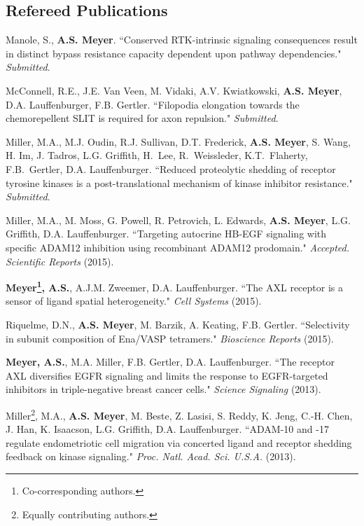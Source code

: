 \documentclass[11pt]{res}
\begin{document}
\begin{resume}
\section{Refereed Publications}
{ \leftskip 0.1in
\parindent -0.1in


Manole, S., {\bf A.S. Meyer}. ``Conserved RTK-intrinsic signaling consequences result in distinct bypass resistance capacity dependent upon pathway dependencies." {\sl Submitted}.

\parskip 0.1in

McConnell, R.E., J.E. Van Veen, M. Vidaki, A.V. Kwiatkowski, {\bf A.S. Meyer}, D.A. Lauffenburger, F.B. Gertler. ``Filopodia elongation towards the chemorepellent SLIT is required for axon repulsion." {\sl Submitted}.

Miller, M.A., M.J. Oudin, R.J. Sullivan, D.T. Frederick, {\bf A.S. Meyer}, S. Wang, H. Im, J. Tadros, L.G. Griffith, H. Lee, R. Weissleder, K.T. Flaherty, F.B. Gertler, D.A. Lauffenburger. ``Reduced proteolytic shedding of receptor tyrosine kinases is a post-translational mechanism of kinase inhibitor resistance." {\sl Submitted}.

Miller, M.A., M. Moss, G. Powell, R. Petrovich, L. Edwards, {\bf A.S. Meyer}, L.G. Griffith, D.A. Lauffenburger. ``Targeting autocrine HB-EGF signaling with specific ADAM12 inhibition using recombinant ADAM12 prodomain." {\sl Accepted. Scientific Reports} (2015).

{\bf Meyer\footnote{Co-corresponding authors.}, A.S.}, A.J.M. Zweemer, D.A. Lauffenburger\footnotemark[\value{footnote}]. ``The AXL receptor is a sensor of ligand spatial heterogeneity." {\sl Cell Systems} (2015).

Riquelme, D.N., {\bf A.S. Meyer}, M. Barzik, A. Keating, F.B. Gertler. ``Selectivity in subunit composition of Ena/VASP tetramers." {\sl Bioscience Reports} (2015).

{\bf Meyer, A.S.}, M.A. Miller, F.B. Gertler, D.A. Lauffenburger. ``The receptor AXL diversifies EGFR signaling and limits the response to EGFR-targeted inhibitors in triple-negative breast cancer cells." {\sl Science Signaling} (2013).

Miller\footnote{Equally contributing authors.}, M.A., {\bf A.S. Meyer}\footnotemark[\value{footnote}], M. Beste, Z. Lasisi, S. Reddy, K. Jeng, C.-H. Chen, J. Han, K. Isaacson, L.G. Griffith, D.A. Lauffenburger. ``ADAM-10 and -17 regulate endometriotic cell migration via concerted ligand and receptor shedding feedback on kinase signaling." {\sl Proc. Natl. Acad. Sci. U.S.A.} (2013).

}
\end{resume}
\end{document}
